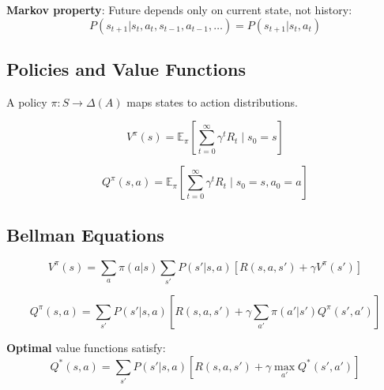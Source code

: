 \textbf{Markov property}: Future depends only on current state, not history:
\begin{equation}
    P(s_{t+1} | s_t, a_t, s_{t-1}, a_{t-1}, \ldots) = P(s_{t+1} | s_t, a_t)
\end{equation}

\subsection{Policies and Value Functions}

\begin{definition}[Policy]
A policy $\pi: S \to \Delta(A)$ maps states to action distributions.
\end{definition}

\begin{definition}
\begin{equation}
    V^\pi(s) = \mathbb{E}_\pi \left[ \sum_{t=0}^\infty \gamma^t R_t \mid s_0 = s \right]
\end{equation}
\end{definition}

\begin{definition}
\begin{equation}
    Q^\pi(s,a) = \mathbb{E}_\pi \left[ \sum_{t=0}^\infty \gamma^t R_t \mid s_0 = s, a_0 = a \right]
\end{equation}
\end{definition}

\subsection{Bellman Equations}


\begin{equation}
    V^\pi(s) = \sum_a \pi(a|s) \sum_{s'} P(s'|s,a) [R(s,a,s') + \gamma V^\pi(s')]
\end{equation}

\begin{equation}
    Q^\pi(s,a) = \sum_{s'} P(s'|s,a) [R(s,a,s') + \gamma \sum_{a'} \pi(a'|s') Q^\pi(s',a')]
\end{equation}

\textbf{Optimal} value functions satisfy:
\begin{equation}
    Q^*(s,a) = \sum_{s'} P(s'|s,a) [R(s,a,s') + \gamma \max_{a'} Q^*(s',a')]
\end{equation}



